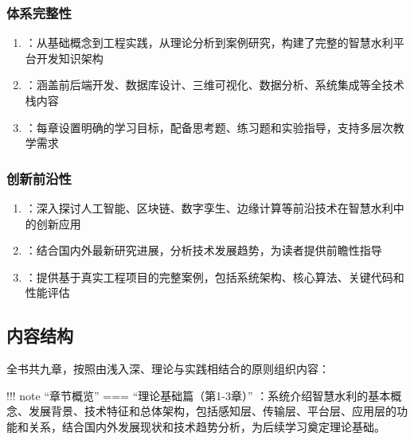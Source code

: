 \hypertarget{ux4f53ux7cfbux5b8cux6574ux6027}{%
\subsubsection{体系完整性}\label{ux4f53ux7cfbux5b8cux6574ux6027}}

\begin{enumerate}
\def\labelenumi{\arabic{enumi}.}
\tightlist
\item
  ：从基础概念到工程实践，从理论分析到案例研究，构建了完整的智慧水利平台开发知识架构
\item
  ：涵盖前后端开发、数据库设计、三维可视化、数据分析、系统集成等全技术栈内容
\item
  ：每章设置明确的学习目标，配备思考题、练习题和实验指导，支持多层次教学需求
\end{enumerate}

\hypertarget{ux521bux65b0ux524dux6cbfux6027}{%
\subsubsection{创新前沿性}\label{ux521bux65b0ux524dux6cbfux6027}}

\begin{enumerate}
\def\labelenumi{\arabic{enumi}.}
\tightlist
\item
  ：深入探讨人工智能、区块链、数字孪生、边缘计算等前沿技术在智慧水利中的创新应用
\item
  ：结合国内外最新研究进展，分析技术发展趋势，为读者提供前瞻性指导
\item
  ：提供基于真实工程项目的完整案例，包括系统架构、核心算法、关键代码和性能评估
\end{enumerate}

\hypertarget{ux5185ux5bb9ux7ed3ux6784}{%
\subsection{内容结构}\label{ux5185ux5bb9ux7ed3ux6784}}

全书共九章，按照由浅入深、理论与实践相结合的原则组织内容：

!!! note ``章节概览'' === ``理论基础篇（第1-3章）'' ：系统介绍智慧水利的基本概念、发展背景、技术特征和总体架构，包括感知层、传输层、平台层、应用层的功能和关系，结合国内外发展现状和技术趋势分析，为后续学习奠定理论基础。

